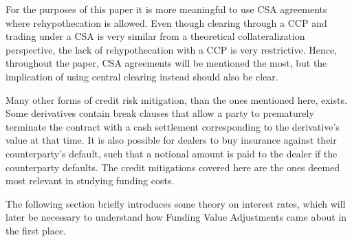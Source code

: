 \documentclass[main.tex]{subfiles}
\begin{document}
        For the purposes of this paper it is more meaningful to use CSA agreements 
        where rehypothecation is allowed.
        Even though clearing through a CCP and trading under a CSA is very similar
        from a theoretical collateralization perspective,
        the lack of rehypothecation with a CCP is very restrictive.
        Hence, throughout the paper, CSA agreements will be mentioned the most,
        but the implication of using central clearing instead should also be clear.

    Many other forms of credit risk mitigation, than the ones mentioned here, exists. 
    Some derivatives contain break clauses that allow a party to prematurely terminate the 
    contract with a cash settlement corresponding to the derivative's value at that time.
    It is also possible for dealers to buy insurance against their counterparty's default,
    such that a notional amount is paid to the dealer if the counterparty defaults.
    The credit mitigations covered here are the ones deemed most relevant in studying funding costs.

    The following section briefly introduces some theory on interest rates,
    which will later be necessary to understand how Funding Value Adjustments 
    came about in the first place.
\end{document}
